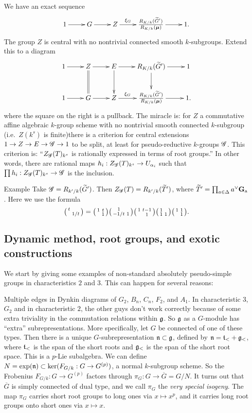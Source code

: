 We have an exact sequence 
\[\xymatrix{
  1 \ar[r] 
    & G \ar[r] 
    & Z \ar[r]^-{\xi_G} 
    & \frac{R_{K/k}(\widetilde G')}{R_{K/k}(\boldsymbol\mu)} \ar[r] 
    & 1 .
}\]
The group $Z$ is central with no nontrivial connected smooth $k$-subgroups. 
Extend this to a diagram 
\[\xymatrix{
  1 \ar[r] 
    & Z \ar[r] \ar@{=}[d] 
    & E \ar[r] \ar[d] 
    & R_{K/k}(\widetilde G') \ar[r] \ar[d] 
    & 1 \\
  1 \ar[r] 
    & G \ar[r] 
    & Z \ar[r]^-{\xi_G} 
    & \frac{R_{K/k}(\widetilde G')}{R_{K/k}(\boldsymbol\mu)} \ar[r] 
    & 1 .
}\]
where the square on the right is a pullback. The miracle is: for $Z$ a 
commutative affine algebraic $k$-group scheme with no nontrivial smooth 
connected $k$-subgroup (i.e.\ $Z(k^s)$ is finite)there is a criterion for 
central extensions $1 \to Z \to E \to \mathscr{G} \to 1$ to be split, at least for 
pseudo-reductive $k$-groups $\mathscr{G}$. This criterion is: ``$Z_{\mathscr{G}}(T)_{k^s}$ is 
rationally expressed in terms of root groups.'' In other words, there are 
rational maps $h_i:Z_{\mathscr{G}}(T)_{k^s} \to U_{\alpha_i}$ such that 
$\prod h_i:Z_{\mathscr{G}}(T)_{k^s} \to \mathscr{G}$ is the inclusion. 

\begin{enonce}[remark]{Example}
Take $\mathscr{G}=R_{k'/k}(\widetilde G')$. Then $Z_{\mathscr{G}}(T)=R_{k'/k}(\widetilde T')$, 
where $\widetilde T'=\prod_{a\in \Delta}a^\vee \mathbf{G}_{\mathrm{a}}$. Here we use the 
formula 
\[
  \bigl(\begin{smallmatrix} t &  \\  & 1/t \end{smallmatrix} \bigr) = \bigl(\begin{smallmatrix} 1 & t \\  & 1 \end{smallmatrix} \bigr) \bigl(\begin{smallmatrix} 1 &  \\ -1/t & 1 \end{smallmatrix} \bigr) \bigl(\begin{smallmatrix} 1 & t-1 \\  & 1 \end{smallmatrix} \bigr) \bigl(\begin{smallmatrix} 1 &  \\ 1 & 1 \end{smallmatrix} \bigr) \bigl(\begin{smallmatrix} 1 & 1 \\  & 1 \end{smallmatrix} \bigr) .
\]
\end{enonce}





\subsection{Dynamic method, root groups, and exotic constructions}

We start by giving some examples of non-standard absolutely pseudo-simple 
groups in characteristics $2$ and $3$. This can happen for several reasons:

Multiple edges in Dynkin diagrams of $G_2$, $B_n$, $C_n$, $F_2$, and $A_1$. In 
characteristic $3$, $G_2$ and in characteristic $2$, the other guys don't work 
correctly because of some extra triviality in the commutation relations within 
$\mathfrak{g}$. So $\mathfrak{g}$ as a $G$-module has ``extra'' subrepresentations. More 
specifically, let $G$ be connected of one of these types. Then there is a 
unique $G$-subrepresentation $\mathfrak{n}\subset \mathfrak{g}$, defined by 
$\mathfrak{n}=\mathfrak{t}_<+\mathfrak{g}_<$, where $\mathfrak{t}_<$ is the span of the short roots and $\mathfrak{g}_<$ is 
the span of the short root space. This is a $p$-Lie subalgebra. We can define  
$N=\exp(\mathfrak{n})\subset \ker(F_{G/k}:G\to G^{(p)})$, a normal $k$-subgroup scheme. 
So the Frobenius $F_{G/k}:G\to G^{(p)}$ factors through 
$\pi_G:G\to \overline G=G/N$. It turns out that $\overline G$ is simply connected 
of dual type, and we call $\pi_G$ the \emph{very special isogeny}. 
The map $\pi_G$ carries short root groups to long ones via $x\mapsto x^p$, and 
it carries long root groups onto short ones via $x\mapsto x$. 


